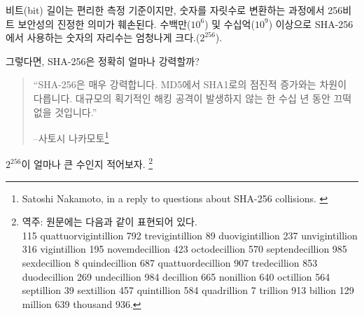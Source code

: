 \begin{comment}
	While bit length is a convenient metric, the true meaning of 256-bit
	security is lost in translation. Similar to the millions ($10^6$) and
	billions ($10^9$) above, the number in SHA-256 is about orders of magnitude
	($2^{256}$).
\end{comment}
비트(bit) 길이는 편리한 측정 기준이지만, 숫자를 자릿수로 변환하는 과정에서 256비트 보안성의 진정한 의미가 훼손된다.
수백만($10^6$) 및 수십억($10^9$) 이상으로 SHA-256에서 사용하는 숫자의 자리수는 엄청나게 크다.($2^{256}$).
\begin{comment}
	So, how strong is SHA-256, exactly?
\end{comment}
그렇다면, SHA-256은 정확히 얼마나 강력할까?

\begin{comment}
	\begin{quotation}\begin{samepage}
			\enquote{SHA-256 is very strong. It's not like the incremental step from MD5
				to SHA1. It can last several decades unless there's some massive
				breakthrough attack.}
			\begin{flushright} -- Satoshi Nakamoto\footnote{Satoshi Nakamoto, in a reply to questions about SHA-256 collisions. \cite{satoshi-sha256}}
	\end{flushright}\end{samepage}\end{quotation}
\end{comment}
\begin{quotation}\begin{samepage}
		\enquote{SHA-256은 매우 강력합니다. MD5에서 SHA1로의 점진적 증가와는 차원이 다릅니다.
			대규모의 획기적인 해킹 공격이 발생하지 않는 한 수십 년 동안 끄떡없을 것입니다.}
		\begin{flushright} --사토시 나카모토\footnote{Satoshi Nakamoto, in a reply to questions about SHA-256 collisions. \cite{satoshi-sha256}}
\end{flushright}\end{samepage}\end{quotation}

$2^{256}$이 얼마나 큰 수인지 적어보자.
\footnote{
	역주: 원문에는 다음과 같이 표현되어 있다. \\
	115 quattuorvigintillion 792 trevigintillion 89 duovigintillion 237
	unvigintillion 316 vigintillion 195 novemdecillion 423 octodecillion 570
	septendecillion 985 sexdecillion 8 quindecillion 687 quattuordecillion 907
	tredecillion 853 duodecillion 269 undecillion 984 decillion 665 nonillion
	640 octillion 564 septillion 39 sextillion 457 quintillion 584 quadrillion 7
	trillion 913 billion 129 million 639 thousand 936.}

